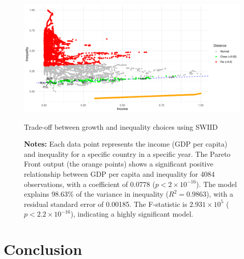 \begin{figure}[h!]
    \centering
    \includegraphics[width=1\linewidth]{figs/Swiid.pdf}
    \caption{Trade-off between growth and inequality choices using SWIID}
    \label{fig:swiid}
    \captionsetup{font=footnotesize}
    \caption*{\textbf{Notes:} Each data point represents the income (GDP per capita) and inequality for a specific country in a specific year. The Pareto Front output (the orange points) shows a significant positive relationship between GDP per capita and inequality for 4084 observations, with a coefficient of 0.0778 (\( p < 2 \times 10^{-16} \)). The model explains 98.63\% of the variance in inequality (\( R^2 = 0.9863 \)), with a residual standard error of 0.00185. The F-statistic is \( 2.931 \times 10^5 \) (\( p < 2.2 \times 10^{-16} \)), indicating a highly significant model.}
\end{figure}

\section{Conclusion} 

